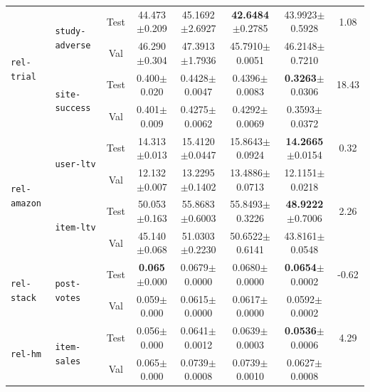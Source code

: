 \documentclass{article} %
\begin{document}
\begin{table}
{\begin{tabular}{llcccc|cc}
\midrule
\multirow{4}{*}{\texttt{rel-trial}}
 & \multirow{2}{*}{\texttt{study-adverse}} & Test & 44.473$\pm$0.209 & 45.1692$\pm$2.6927 & \textbf{42.6484}$\pm$0.2785 & 43.9923$\pm$0.5928 & \cellcolor{lightblue}1.08 \\
 & & Val & 46.290$\pm$0.304 & 47.3913$\pm$1.7936 & 45.7910$\pm$0.0051 & 46.2148$\pm$0.7210 & \\
 & \multirow{2}{*}{\texttt{site-success}} & Test & 0.400$\pm$0.020 & 0.4428$\pm$0.0047 & 0.4396$\pm$0.0083 & \textbf{0.3263}$\pm$0.0306 & \cellcolor{mediumblue}18.43 \\
 & & Val & 0.401$\pm$0.009 & 0.4275$\pm$0.0062 & 0.4292$\pm$0.0069 & 0.3593$\pm$0.0372 &  \\

\midrule
\multirow{4}{*}{\texttt{rel-amazon}}
 & \multirow{2}{*}{\texttt{user-ltv}} & Test & 14.313$\pm$0.013 & 15.4120$\pm$0.0447 & 15.8643$\pm$0.0924 & \textbf{14.2665}$\pm$0.0154 & \cellcolor{lightblue}0.32 \\
 & & Val & 12.132$\pm$0.007 & 13.2295$\pm$0.1402 & 13.4886$\pm$0.0713 & 12.1151$\pm$0.0218 & \\
 & \multirow{2}{*}{\texttt{item-ltv}} & Test & 50.053$\pm$0.163 & 55.8683$\pm$0.6003 & 55.8493$\pm$0.3226 & \textbf{48.9222}$\pm$0.7006 & \cellcolor{lightblue}2.26 \\
 & & Val & 45.140$\pm$0.068 & 51.0303$\pm$0.2230 & 50.6522$\pm$0.6141 & 43.8161$\pm$0.0548 &  \\

\midrule
\multirow{2}{*}{\texttt{rel-stack}}
 & \multirow{2}{*}{\texttt{post-votes}} & Test & \textbf{0.065}$\pm$0.000 & 0.0679$\pm$0.0000 & 0.0680$\pm$0.0000 & \textbf{0.0654}$\pm$0.0002 & \cellcolor{mediumred}-0.62 \\
 & & Val & 0.059$\pm$0.000 & 0.0615$\pm$0.0000 & 0.0617$\pm$0.0000 & 0.0592$\pm$0.0002 & \\

\midrule
\multirow{2}{*}{\texttt{rel-hm}}
 & \multirow{2}{*}{\texttt{item-sales}} & Test & 0.056$\pm$0.000 & 0.0641$\pm$0.0012 & 0.0639$\pm$0.0003 & \textbf{0.0536}$\pm$0.0006 & \cellcolor{mediumblue}4.29 \\
 & & Val & 0.065$\pm$0.000 & 0.0739$\pm$0.0008 & 0.0739$\pm$0.0010 & 0.0627$\pm$0.0008 & \\

\bottomrule
\end{tabular}
}
\end{table}
\end{document}
